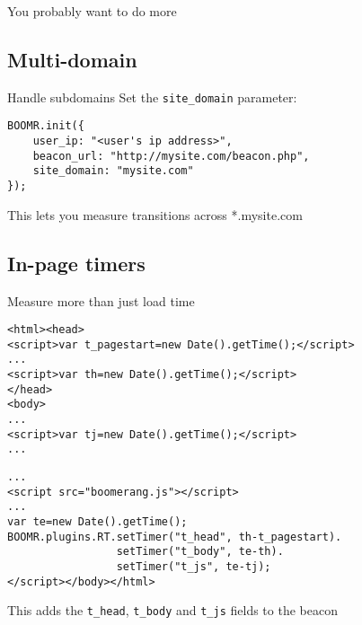 \documentclass{beamer}
\begin{document}
\begin{frame}{}
  \begin{center}
  You probably want to do more
  \end{center}
\end{frame}

\subsection{Multi-domain}
\begin{frame}[fragile]{Handle subdomains}
Set the \texttt{site\_domain} parameter:
\begin{verbatim}
BOOMR.init({
    user_ip: "<user's ip address>",
    beacon_url: "http://mysite.com/beacon.php",
    site_domain: "mysite.com"
});
\end{verbatim}
\end{frame}

\begin{frame}{}
\begin{center}
This lets you measure transitions across *.mysite.com
\end{center}
\end{frame}

\subsection{In-page timers}
\begin{frame}[fragile]{Measure more than just load time}
\begin{verbatim}
<html><head>
<script>var t_pagestart=new Date().getTime();</script>
...
<script>var th=new Date().getTime();</script>
</head>
<body>
...
<script>var tj=new Date().getTime();</script>
...
\end{verbatim}
\end{frame}

\begin{frame}[fragile]{}
\begin{verbatim}
...
<script src="boomerang.js"></script>
...
var te=new Date().getTime();
BOOMR.plugins.RT.setTimer("t_head", th-t_pagestart).
                 setTimer("t_body", te-th).
                 setTimer("t_js", te-tj);
</script></body></html>
\end{verbatim}
\end{frame}

\begin{frame}{}
  \begin{center}
  This adds the \texttt{t\_head}, \texttt{t\_body} and \texttt{t\_js} fields to the beacon
  \end{center}
\end{frame}
\end{document}
